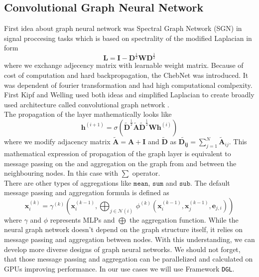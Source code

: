 \subsection{Convolutional Graph Neural Network}
First idea about graph neural network was Spectral Graph Network (SGN) \cite{sgn} in signal proccesing tasks which is based on spectrality of the modified  Laplacian in form \begin{equation}
	\mathbf{L}= \mathbf{I} - \mathbf{D}^{\frac{1}{2}}\mathbf{W}\mathbf{D}^{\frac{1}{2}} 
\end{equation}where we exchange adjecency matrix with learnable weight matrix.
Because of cost of computation and hard backpropagation, the ChebNet was introduced\cite{cheb}. 
It was dependent of fourier transformation and had high computational comlpexity.
First Kipf and Welling used both ideas and simplified Laplacian to create broadly used architecture called convolutional graph network \cite{gcn}. \\
The propagation of the layer mathematically looks like
\begin{equation}
	\mathbf{h}^{(i+1)}=\sigma(\tilde{\mathbf{D}}^{\frac{1}{2}}\tilde{\mathbf{A}}\tilde{\mathbf{D}}^{\frac{1}{2}}\mathbf{W}\mathbf{h}^{(i)})
\end{equation} where we modify adjacency matrix $\tilde{\mathbf{A}}=\mathbf{A}+ \mathbf{I}$ and $\tilde{\mathbf{D}}$ as $\tilde{\mathbf{D_{ij}}} =\sum_{j=1}^N \tilde{\mathbf{A}}_{ij}.$ 
This mathematical expression of propagation of the graph layer is equivalent to message passing on the  and aggregation on the graph from and between the neighbouring nodes. In this case with $\sum$ operator.\\ There are other types of aggregations like $\texttt{mean}$, $\texttt{sum}$ and $\texttt{sub}$. 
The default message passing and aggregation formula is defined as
\begin{equation}
\mathbf{x}_i^{(k)} = \gamma^{(k)} \left( \mathbf{x}_i^{(k-1)}, \bigoplus_{j \in \mathcal{N}(i)} \, \phi^{(k)}\left(\mathbf{x}_i^{(k-1)}, \mathbf{x}_j^{(k-1)},\mathbf{e}_{j,i}\right) \right) 
\end{equation} where $\gamma$ and $\phi$ represents MLPs and $\bigoplus$ the aggregation function. 
While the neural graph network doesn't depend on the graph structure itself, it relies on message passing and aggregation between nodes. With this understanding, we can develop more diverse designs of graph neural networks. 
We should not forget, that those message passing and aggregation can be parallelized and calculated on GPUs improving performance. In our use cases we will use Framework \texttt{DGL}\cite{dgl}.


